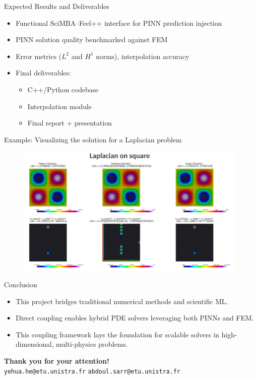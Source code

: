 \documentclass{beamer}
\begin{document}
\begin{frame}{Expected Results and Deliverables}
\begin{itemize}
  \item Functional SciMBA–Feel++ interface for PINN prediction injection
  \item PINN solution quality benchmarked against FEM
  \item Error metrics ($L^2$ and $H^1$ norms), interpolation accuracy
  \item Final deliverables:
  \begin{itemize}
    \item C++/Python codebase
    \item Interpolation module
    \item Final report + presentation
  \end{itemize}
\end{itemize}
\end{frame}

\begin{frame}{Example: Visualizing the solution for a Laplacian problem}
\begin{figure}
    \centering
    \includegraphics[width=1\linewidth]{docs//proposals//2025//images/laplacian.png}
    \label{fig:enter-label}
\end{figure}
\end{frame}

\begin{frame}{Conclusion}
\begin{itemize}
  \item This project bridges traditional numerical methods and scientific ML.
  \item Direct coupling enables hybrid PDE solvers leveraging both PINNs and FEM.
  \item This coupling framework lays the foundation for scalable solvers in high-dimensional, multi-physics problems.
\end{itemize}
\vspace{1em}
\centering
\textbf{Thank you for your attention!} \\
\texttt{yehua.he@etu.unistra.fr} \quad \texttt{abdoul.sarr@etu.unistra.fr}
\end{frame}
\end{document}
